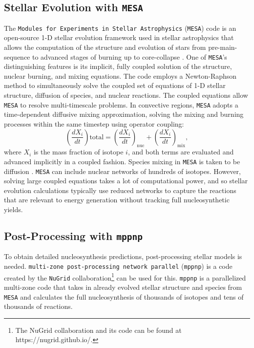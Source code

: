 \subsection{Stellar Evolution with \texttt{MESA}}

The \texttt{Modules for Experiments in Stellar Astrophysics} (\texttt{MESA}) code is an open-source 1-D stellar evolution framework used in stellar astrophysics that allows the computation of the structure and evolution of stars from pre-main-sequence to advanced stages of burning up to core-collapse \cite{paxtonMODULESEXPERIMENTSLAR2010}.
One of \texttt{MESA}’s distinguishing features is its implicit, fully coupled solution of the structure, nuclear burning, and mixing equations. 
The code employs a Newton-Raphson method to simultaneously solve the coupled set of equations of 1-D stellar structure, diffusion of species, and nuclear reactions.
The coupled equations allow \texttt{MESA} to resolve multi-timescale problems.
In convective regions, \texttt{MESA} adopts a time-dependent diffusive mixing approximation, solving the mixing and burning processes within the same timestep using operator coupling:
\begin{equation}
\left( \frac{dX_i}{dt} \right)\text{total} = \left( \frac{dX_i}{dt} \right)_\text{nuc} + \left( \frac{dX_i}{dt} \right)_\text{mix},
\end{equation}
where $X_i$ is the mass fraction of isotope $i$, and both terms are evaluated and advanced implicitly in a coupled fashion. 
Species mixing in \texttt{MESA} is taken to be diffusion \cite{paxtonMODULESEXPERIMENTSLAR2010}.
\texttt{MESA} can include nuclear networks of hundreds of isotopes.
However, solving large coupled equations takes a lot of computational power, and so stellar evolution calculations typically use reduced networks to capture the reactions that are relevant to energy generation without tracking full nucleosynthetic yields.

\subsection{Post-Processing with \texttt{mppnp}}

To obtain detailed nucleosynthesis predictions, post-processing stellar models is needed.
\texttt{multi-zone post-processing network parallel} (\texttt{mppnp}) is a code created by the \texttt{NuGrid} collaboration\footnote{The NuGrid collaboration and its code can be found at https://nugrid.github.io/.} can be used for this.
\texttt{mppnp} is a parallelized multi-zone code that takes in already evolved stellar structure and species from \texttt{MESA} and calculates the full nucleosynthesis of thousands of isotopes and tens of thousands of reactions.

